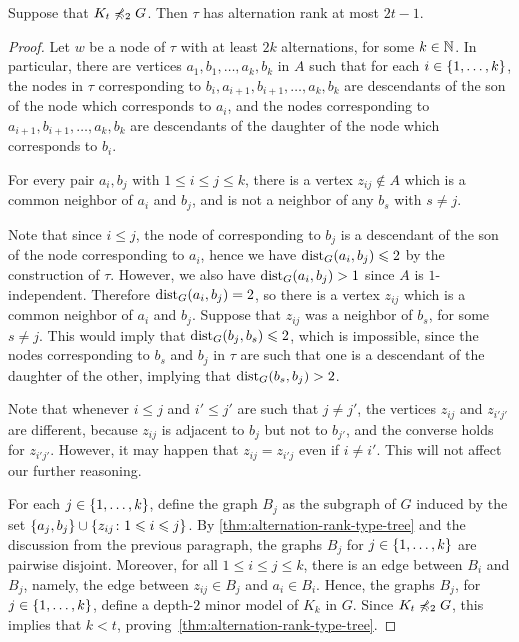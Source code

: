 \begin{lemma}\label{thm:alternation-rank-type-tree}
Suppose that  $K_t\not\preccurlyeq_{2} G$.
Then $\tau$ has alternation rank at most $2t-1$.
\end{lemma}
\begin{proof}
	Let $w$ be a node of $\tau$ with at least $2k$ alternations, for some $k\in \mathbb{N}$.
	In particular, there are vertices $a_1,b_1,\ldots,a_k,b_k$ in $A$
	such that for each $i\in \{1,\ldots,k\}$, 
	the nodes in $\tau$ corresponding to $b_i,a_{i+1},b_{i+1},\ldots,a_k,b_k$ are  descendants of the son of the node which corresponds to $a_i$,
	and the nodes corresponding to $a_{i+1},b_{i+1},\ldots,a_k,b_k$
	are descendants of the daughter of the node which corresponds to $b_i$.
	
	\begin{claim}\label{claim:minor}
		For every pair $a_i,b_j$ with $1\le i\le j\le k$, there is a vertex $z_{ij}\not\in A$		which is a common neighbor of $a_i$ and $b_j$,
		and is not a neighbor of any $b_s$ with $s\neq j$.
	\end{claim}
	\begin{clproof}
		Note that since $i\le j$, the node of corresponding to $b_j$ is a descendant of the son of the node corresponding to $a_i$, hence we have $\mathrm{dist}_G(a_i,b_j)\leqslant 2$ by the construction of $\tau$.
		However, we also have $\mathrm{dist}_G(a_i,b_j)>1$ since $A$
		is $1$-independent. Therefore $\mathrm{dist}_G(a_i,b_j)=2$, so there is a vertex $z_{ij}$ which is a common neighbor of $a_i$ and $b_j$. 
		Suppose that $z_{ij}$ was a neighbor of $b_s$, for some $s\neq j$. This would imply that $\mathrm{dist}_G(b_j,b_s)\leqslant 2$, which is impossible, 
since
		 the nodes corresponding to $b_s$ and $b_j$ in $\tau$ are such that one is a descendant of the daughter of the other, implying that $\mathrm{dist}_G(b_s,b_j)>2$.
	\end{clproof}
  
Note that whenever $i\leq j$ and $i'\leq j'$ are such that $j\neq j'$, the vertices $z_{ij}$ and $z_{i'j'}$ are different, because $z_{ij}$ is adjacent to $b_{j}$ but not to $b_{j'}$, and the converse holds for $z_{i'j'}$.
However, it may happen that $z_{ij}=z_{i'j}$ even if $i\neq i'$. This will not affect our further reasoning.

For each $j\in\{1,\ldots,k\}$, define the graph $B_j$
as the subgraph of $G$ induced by the set
$\{a_j,b_j\}\cup\{z_{ij}\colon 1\leqslant i\leqslant  j\}$.
By \cref{thm:alternation-rank-type-tree} and the discussion from the previous paragraph, the graphs $B_j$ for $j\in \{1,\ldots,k\}$
are pairwise disjoint.
Moreover, for all $1\le i\le j\le k$, there is an edge between $B_i$
and $B_j$, namely, the edge between $z_{ij}\in B_j$
and $a_i\in B_i$.
Hence, the graphs $B_j$, for $j\in \{1,\ldots,k\}$, define a depth-$2$ minor model of $K_k$ in $G$. Since $K_t\not\preccurlyeq_{2}G$, this implies that $k<t$, proving~\cref{thm:alternation-rank-type-tree}.
\end{proof}

